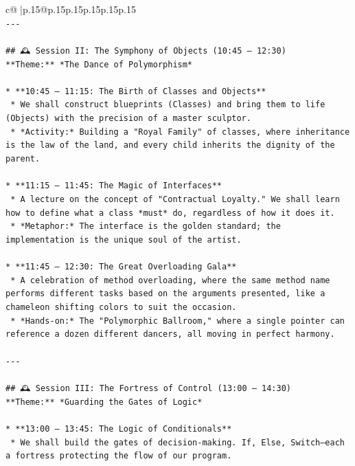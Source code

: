 \documentclass{article}
\begin{document}
{\begin{supertabular}{c@{$\;$}|p{.15\linewidth}@{}p{.15\linewidth}p{.15\linewidth}p{.15\linewidth}p{.15\linewidth}p{.15\linewidth}}
{{{\\ 
\texttt{{-}{-}{-}} \\
\\ 
\texttt{\#\# 🕰️ Session II: The Symphony of Objects (10:45 – 12:30)} \\
\texttt{**Theme:** *The Dance of Polymorphism*} \\
\\ 
\texttt{*   **10:45 – 11:15: The Birth of Classes and Objects**} \\
\texttt{    *   We shall construct blueprints (Classes) and bring them to life (Objects) with the precision of a master sculptor.} \\
\texttt{    *   *Activity:* Building a "Royal Family" of classes, where inheritance is the law of the land, and every child inherits the dignity of the parent.} \\
\\ 
\texttt{*   **11:15 – 11:45: The Magic of Interfaces**} \\
\texttt{    *   A lecture on the concept of "Contractual Loyalty." We shall learn how to define what a class *must* do, regardless of how it does it.} \\
\texttt{    *   *Metaphor:* The interface is the golden standard; the implementation is the unique soul of the artist.} \\
\\ 
\texttt{*   **11:45 – 12:30: The Great Overloading Gala**} \\
\texttt{    *   A celebration of method overloading, where the same method name performs different tasks based on the arguments presented, like a chameleon shifting colors to suit the occasion.} \\
\texttt{    *   *Hands{-}on:* The "Polymorphic Ballroom," where a single pointer can reference a dozen different dancers, all moving in perfect harmony.} \\
\\ 
\texttt{{-}{-}{-}} \\
\\ 
\texttt{\#\# 🕰️ Session III: The Fortress of Control (13:00 – 14:30)} \\
\texttt{**Theme:** *Guarding the Gates of Logic*} \\
\\ 
\texttt{*   **13:00 – 13:45: The Logic of Conditionals**} \\
\texttt{    *   We shall build the gates of decision{-}making. If, Else, Switch—each a fortress protecting the flow of our program.} \\
}}}
\end{supertabular}}
\end{document}

